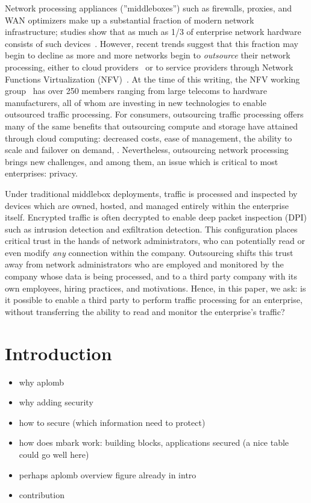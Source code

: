 

    Network processing appliances (''middleboxes'') such as firewalls, proxies, and WAN optimizers make up a substantial fraction of modern network infrastructure; studies show that as much as 1/3 of enterprise network hardware consists of such devices~\cite{aplomb}.
    However, recent trends suggest that this fraction may begin to decline as more and more networks begin to {\it outsource} their network processing, either to cloud providers~\cite{aplomb, aryaka, zscalar} or to service providers through Network Functions Virtualization (NFV)~\cite{nfv}.
    At the time of this writing, the NFV working group~\cite{nfvwg} has over 250 members ranging from large telecoms to hardware manufacturers, all of whom are investing in new technologies to enable outsourced traffic processing.
    For consumers, outsourcing traffic processing offers many of the same benefits that outsourcing compute and storage have attained through cloud computing: decreased costs, ease of management, the ability to scale and failover on demand, \etc{}.
    Nevertheless, outsourcing network processing brings new challenges, and among them, an issue which is critical to most enterprises: privacy.
    
    Under traditional middlebox deployments, traffic is processed and inspected by devices which are owned, hosted, and managed entirely within the enterprise itself.
    Encrypted traffic is often decrypted to enable deep packet inspection (DPI) such as intrusion detection and exfiltration detection.
    This configuration places critical trust in the hands of network administrators, who can potentially read or even modify {\it any} connection within the company.
    Outsourcing shifts this trust away from network administrators who are employed and monitored by the company whose data is being processed, and to a third party company with its own employees, hiring practices, and motivations.
    Hence, in this paper, we ask: is it possible to enable a third party to perform traffic processing for an enterprise, without transferring the ability to read and monitor the enterprise's traffic?
    
    
\section{Introduction}\label{sec:intro}
\begin{itemize}
\item why aplomb
\item why adding security
\item how to secure (which information need to protect)
\item how does mbark work: building blocks, applications secured (a nice table could go well here)
\item perhaps aplomb overview figure already in intro
\item contribution
\end{itemize}
